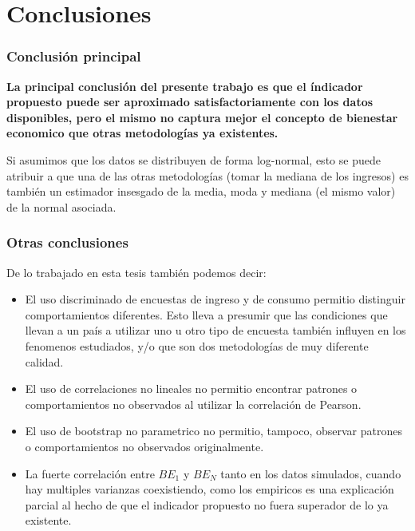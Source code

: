 \chapter{Conclusiones} \label{chapter:conclusiones}

\subsection{Conclusión principal}

\textbf{La principal conclusión del presente trabajo es que el índicador propuesto puede ser aproximado satisfactoriamente con los datos disponibles, pero el mismo no captura mejor el concepto de bienestar economico que otras metodologías ya existentes.}

Si asumimos que los datos se distribuyen de forma log-normal, esto se puede atribuir a que una de las otras metodologías (tomar la mediana de los ingresos) es también un estimador insesgado de la media, moda y mediana (el mismo valor) de la normal asociada.

\subsection{Otras conclusiones}

De lo trabajado en esta tesis también podemos decir:

\begin{itemize}
    \item El uso discriminado de encuestas de ingreso y de consumo permitio distinguir comportamientos diferentes. Esto lleva a presumir que las condiciones que llevan a un país a utilizar uno u otro tipo de encuesta también influyen en los fenomenos estudiados, y/o que son dos metodologías de muy diferente calidad.
    
    \item El uso de correlaciones no lineales no permitio encontrar patrones o comportamientos no observados al utilizar la correlación de Pearson.
    
    \item El uso de bootstrap no parametrico no permitio, tampoco, observar patrones o comportamientos no observados originalmente.

    \item La fuerte correlación entre $BE_1$ y $BE_N$ tanto en los datos simulados, cuando hay multiples varianzas coexistiendo, como los empiricos es una explicación parcial al hecho de que el indicador propuesto no fuera superador de lo ya existente.
\end{itemize}

